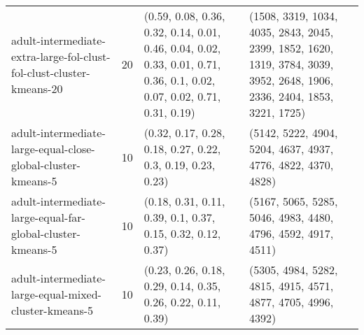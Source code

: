 \begin{longtable}{llll}
                                         adult-intermediate-extra-large-fol-clust-fol-clust-cluster-kmeans-20 &             20 &                                                                                                                                                                                   (0.59, 0.08, 0.36, 0.32, 0.14, 0.01, 0.46, 0.04, 0.02, 0.33, 0.01, 0.71, 0.36, 0.1, 0.02, 0.07, 0.02, 0.71, 0.31, 0.19) &                                                                                                                                                                                  (1508, 3319, 1034, 4035, 2843, 2045, 2399, 1852, 1620, 1319, 3784, 3039, 3952, 2648, 1906, 2336, 2404, 1853, 3221, 1725) \\
                                                 adult-intermediate-large-equal-close-global-cluster-kmeans-5 &             10 &                                                                                                                                                                                                                                               (0.32, 0.17, 0.28, 0.18, 0.27, 0.22, 0.3, 0.19, 0.23, 0.23) &                                                                                                                                                                                                                                              (5142, 5222, 4904, 5204, 4637, 4937, 4776, 4822, 4370, 4828) \\
                                                   adult-intermediate-large-equal-far-global-cluster-kmeans-5 &             10 &                                                                                                                                                                                                                                               (0.18, 0.31, 0.11, 0.39, 0.1, 0.37, 0.15, 0.32, 0.12, 0.37) &                                                                                                                                                                                                                                              (5167, 5065, 5285, 5046, 4983, 4480, 4796, 4592, 4917, 4511) \\
                                                        adult-intermediate-large-equal-mixed-cluster-kmeans-5 &             10 &                                                                                                                                                                                                                                              (0.23, 0.26, 0.18, 0.29, 0.14, 0.35, 0.26, 0.22, 0.11, 0.39) &                                                                                                                                                                                                                                              (5305, 4984, 5282, 4815, 4915, 4571, 4877, 4705, 4996, 4392) \\

\end{longtable}
